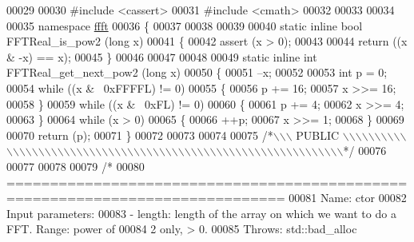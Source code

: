 \begin{DoxyCode}
00029 
00030 \textcolor{preprocessor}{#include    <cassert>}
00031 \textcolor{preprocessor}{#include    <cmath>}
00032 
00033 
00034 
00035 \textcolor{keyword}{namespace }\hyperlink{a00142}{ffft}
00036 \{
00037 
00038 
00039 
00040 \textcolor{keyword}{static} \textcolor{keyword}{inline} \textcolor{keywordtype}{bool}  FFTReal\_is\_pow2 (\textcolor{keywordtype}{long} x)
00041 \{
00042     assert (x > 0);
00043 
00044     \textcolor{keywordflow}{return}  ((x & -x) == x);
00045 \}
00046 
00047 
00048 
00049 \textcolor{keyword}{static} \textcolor{keyword}{inline} \textcolor{keywordtype}{int}   FFTReal\_get\_next\_pow2 (\textcolor{keywordtype}{long} x)
00050 \{
00051     --x;
00052 
00053     \textcolor{keywordtype}{int}             p = 0;
00054     \textcolor{keywordflow}{while} ((x & ~0xFFFFL) != 0)
00055     \{
00056         p += 16;
00057         x >>= 16;
00058     \}
00059     \textcolor{keywordflow}{while} ((x & ~0xFL) != 0)
00060     \{
00061         p += 4;
00062         x >>= 4;
00063     \}
00064     \textcolor{keywordflow}{while} (x > 0)
00065     \{
00066         ++p;
00067         x >>= 1;
00068     \}
00069 
00070     \textcolor{keywordflow}{return} (p);
00071 \}
00072 
00073 
00074 
00075 \textcolor{comment}{/*\(\backslash\)\(\backslash\)\(\backslash\) PUBLIC \(\backslash\)\(\backslash\)\(\backslash\)\(\backslash\)\(\backslash\)\(\backslash\)\(\backslash\)\(\backslash\)\(\backslash\)\(\backslash\)\(\backslash\)\(\backslash\)\(\backslash\)\(\backslash\)\(\backslash\)\(\backslash\)\(\backslash\)\(\backslash\)\(\backslash\)\(\backslash\)\(\backslash\)\(\backslash\)\(\backslash\)\(\backslash\)\(\backslash\)\(\backslash\)\(\backslash\)\(\backslash\)\(\backslash\)\(\backslash\)\(\backslash\)\(\backslash\)\(\backslash\)\(\backslash\)\(\backslash\)\(\backslash\)\(\backslash\)\(\backslash\)\(\backslash\)\(\backslash\)\(\backslash\)\(\backslash\)\(\backslash\)\(\backslash\)\(\backslash\)\(\backslash\)\(\backslash\)\(\backslash\)\(\backslash\)\(\backslash\)\(\backslash\)\(\backslash\)\(\backslash\)\(\backslash\)\(\backslash\)\(\backslash\)\(\backslash\)\(\backslash\)\(\backslash\)\(\backslash\)\(\backslash\)\(\backslash\)\(\backslash\)*/}
00076 
00077 
00078 
00079 \textcolor{comment}{/*}
00080 \textcolor{comment}{==============================================================================}
00081 \textcolor{comment}{Name: ctor}
00082 \textcolor{comment}{Input parameters:}
00083 \textcolor{comment}{    - length: length of the array on which we want to do a FFT. Range: power of}
00084 \textcolor{comment}{        2 only, > 0.}
00085 \textcolor{comment}{Throws: std::bad\_alloc}

\end{DoxyCode}
